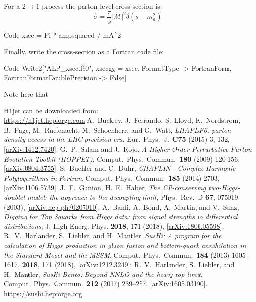 \documentclass[12pt,a4wide]{article}
\begin{document}
For a $2 \rightarrow 1$ process the parton-level cross-section is: 
\begin{equation}
	\hat{\sigma} = \frac{\pi}{s} \left \vert \mathcal{M} \right \vert^2 \delta \left ( s - m_a^2 \right ) 
\end{equation}
\begin{mmaCell}{Code}
xsec = Pi * ampsquared / mA^2 
\end{mmaCell}
Finally, write the cross-section as a Fortran code file: 
\begin{mmaCell}{Code}
Write2["ALP_xsec.f90", xsecgg = xsec, FormatType -> FortranForm, FortranFormatDoublePrecision -> False] 
\end{mmaCell}
Note here that 

\ifstandalone
\begin{thebibliography}{1}
    H1jet can be downloaded from: \\ \href{https://h1jet.hepforge.com}{https://h1jet.hepforge.com}
    A.\ Buckley, J.\ Ferrando, S.\ Lloyd, K.\ Nordstrom, B.\ Page, M.\ Ruefenacht, M.\ Schoenherr, and G.\ Watt, \textit{LHAPDF6: parton density access in the LHC precision era}, Eur.\ Phys.\ J.\ \textbf{C75} (2015) 3, 132, [\href{https://arxiv.org/abs/1412.7420}{arXiv:1412.7420}]. 
    G.\ P.\ Salam and J.\ Rojo, \textit{A Higher Order Perturbative Parton Evolution Toolkit (HOPPET)}, Comput.\ Phys.\ Commun.\ \textbf{180} (2009) 120-156, [\href{https://arxiv.org/abs/0804.3755}{arXiv:0804.3755}]. 
    S.\ Buehler and C.\ Duhr, \textit{CHAPLIN - Complex Harmonic Polylogarithms in Fortran}, Comput.\ Phys.\ Commun.\ \textbf{185} (2014) 2703, [\href{https://arxiv.org/abs/1106.5739}{arXiv:1106.5739}]. 
    J.\ F.\ Gunion, H.\ E.\ Haber, \textit{The CP-conserving two-Higgs-doublet model: the approach to the decoupling limit}, Phys.\ Rev.\ D \textbf{67}, 075019 (2003), [\href{https://arxiv.org/abs/hep-ph/0207010}{arXiv:hep-ph/0207010}]. 
    A.\ Banfi, A.\ Bond, A.\ Martin, and V.\ Sanz, \textit{Digging for Top Squarks from Higgs data: from signal strengths to differential distributions}, J. High Energ. Phys. \textbf{2018}, 171 (2018), [\href{https://arxiv.org/abs/1806.05598}{arXiv:1806.05598}]. 
    R.\ V.\ Harlander, S.\ Liebler, and H.\ Mantler, \textit{SusHi: A program for the calculation of Higgs production in gluon fusion and bottom-quark annihilation in the Standard Model and the MSSM}, Comput.\ Phys.\ Commun.\ \textbf{184} (2013) 1605–1617, \textbf{2018}, 171 (2018), [\href{https://arxiv.org/abs/1212.3249}{arXiv:1212.3249}]; R.\ V.\ Harlander, S.\ Liebler, and H.\ Mantler, \textit{SusHi Bento: Beyond NNLO and the heavy-top limit}, Comput.\ Phys.\ Commun.\ \textbf{212} (2017) 239–257, [\href{https://arxiv.org/abs/1605.03190}{arXiv:1605.03190}]. \\ \href{https://sushi.hepforge.org}{https://sushi.hepforge.org} 

\end{thebibliography}
\end{document}
